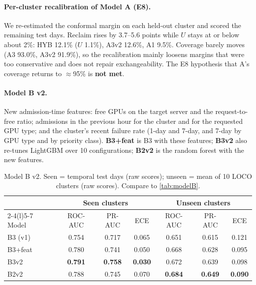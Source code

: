 \paragraph{Per-cluster recalibration of Model A (E8).} We re-estimated the conformal margin on each held-out cluster and scored the remaining test days. Reclaim rises by 3.7--5.6 points while $U$ stays at or below about 2\%: HYB 12.1\% ($U$ 1.1\%), A3v2 12.6\%, A1 9.5\%. Coverage barely moves (A3 93.0\%, A3v2 91.9\%), so the recalibration mainly loosens margins that were too conservative and does not repair exchangeability. The E8 hypothesis that A's coverage returns to $\approx$95\% is \textbf{not met}.

\paragraph{Model B v2.} New admission-time features: free GPUs on the target server and the request-to-free ratio; admissions in the previous hour for the cluster and for the requested GPU type; and the cluster's recent failure rate (1-day and 7-day, and 7-day by GPU type and by priority class). \textbf{B3+feat} is B3 with these features; \textbf{B3v2} also re-tunes LightGBM over 10 configurations; \textbf{B2v2} is the random forest with the new features.

\begin{table}[h]
\centering\small
\caption{Model B v2. Seen = temporal test days (raw scores); unseen = mean of 10 LOCO clusters (raw scores). Compare to \cref{tab:modelB}.}
\label{tab:v2B}
\begin{tabular}{@{}lcccccc@{}}
\toprule
& \multicolumn{3}{c}{Seen clusters} & \multicolumn{3}{c}{Unseen clusters} \\
\cmidrule(lr){2-4}\cmidrule(l){5-7}
Model & ROC-AUC & PR-AUC & ECE & ROC-AUC & PR-AUC & ECE \\
\midrule
B3 (v1)  & 0.754 & 0.717 & 0.065 & 0.651 & 0.615 & 0.121 \\
B3+feat  & 0.780 & 0.741 & 0.050 & 0.668 & 0.628 & 0.095 \\
B3v2     & \textbf{0.791} & \textbf{0.758} & \textbf{0.030} & 0.672 & 0.639 & 0.098 \\
B2v2     & 0.788 & 0.745 & 0.070 & \textbf{0.684} & \textbf{0.649} & \textbf{0.090} \\
\bottomrule
\end{tabular}
\end{table}

